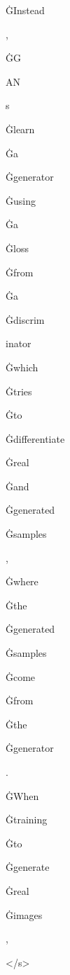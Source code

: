 \documentclass[varwidth]{standalone}
\begin{document}
\begin{CJK*}{UTF8}{gbsn}
{{{\colorbox{red!0.3164443373680115}{\strut ĠInstead} \colorbox{red!3.5879011154174805}{\strut ,} \colorbox{red!3.287008047103882}{\strut ĠG} \colorbox{red!5.286753177642822}{\strut AN} \colorbox{red!4.608163833618164}{\strut s} \colorbox{red!7.966606140136719}{\strut Ġlearn} \colorbox{red!3.2019073963165283}{\strut Ġa} \colorbox{red!1.7637280225753784}{\strut Ġgenerator} \colorbox{red!1.4033026695251465}{\strut Ġusing} \colorbox{red!2.1647346019744873}{\strut Ġa} \colorbox{red!0.9709295630455017}{\strut Ġloss} \colorbox{red!1.258801817893982}{\strut Ġfrom} \colorbox{red!2.5590715408325195}{\strut Ġa} \colorbox{red!2.4978771209716797}{\strut Ġdiscrim} \colorbox{red!2.242016077041626}{\strut inator} \colorbox{red!1.8515219688415527}{\strut Ġwhich} \colorbox{red!0.8562313318252563}{\strut Ġtries} \colorbox{red!1.846670150756836}{\strut Ġto} \colorbox{red!0.8203532695770264}{\strut Ġdifferentiate} \colorbox{red!1.1488971710205078}{\strut Ġreal} \colorbox{red!2.151524305343628}{\strut Ġand} \colorbox{red!1.6521539688110352}{\strut Ġgenerated} \colorbox{red!2.029895305633545}{\strut Ġsamples} \colorbox{red!1.4810059070587158}{\strut ,} \colorbox{red!0.8278630971908569}{\strut Ġwhere} \colorbox{red!0.6818980574607849}{\strut Ġthe} \colorbox{red!0.5655345916748047}{\strut Ġgenerated} \colorbox{red!0.752246081829071}{\strut Ġsamples} \colorbox{red!0.6700465679168701}{\strut Ġcome} \colorbox{red!0.9559093117713928}{\strut Ġfrom} \colorbox{red!1.8860498666763306}{\strut Ġthe} \colorbox{red!0.5506322979927063}{\strut Ġgenerator} \colorbox{red!2.5627601146698}{\strut .} \colorbox{red!1.672533392906189}{\strut ĠWhen} \colorbox{red!4.178869247436523}{\strut Ġtraining} \colorbox{red!2.6645712852478027}{\strut Ġto} \colorbox{red!2.60878849029541}{\strut Ġgenerate} \colorbox{red!1.403841495513916}{\strut Ġreal} \colorbox{red!3.8569133281707764}{\strut Ġimages} \colorbox{red!1.5411922931671143}{\strut ,} \colorbox{red!1.2578623294830322}{\strut </s>} 
}}}
\end{CJK*}
\end{document}
